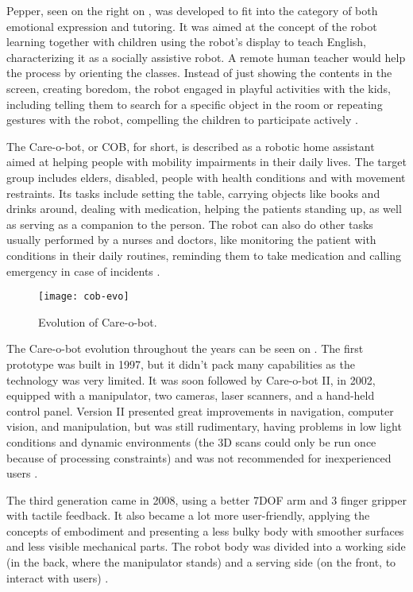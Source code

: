 Pepper, seen on the right on , was developed to fit into the category of both emotional expression and tutoring. It was aimed at the concept of the robot learning together with children using the robot's display to teach English, characterizing it as a socially assistive robot. A remote human teacher would help the process by orienting the classes. Instead of just showing the contents in the screen, creating boredom, the robot engaged in playful activities with the kids, including telling them to search for a specific object in the room or repeating gestures with the robot, compelling the children to participate actively \cite{tanaka2015pepper}.

The Care-o-bot, or COB, for short, is described as a robotic home assistant aimed at helping people with mobility impairments in their daily lives. The target group includes elders, disabled, people with health conditions and with movement restraints. Its tasks include setting the table, carrying objects like books and drinks around, dealing with medication, helping the patients standing up, as well as serving as a companion to the person. The robot can also do other tasks usually performed by a nurses and doctors, like monitoring the patient with conditions in their daily routines, reminding them to take medication and calling emergency in case of incidents \cite{graf2004care}.

\begin{figure}[!ht]
    \centering
    \texttt{[image: cob-evo]}
    \caption{Evolution of Care-o-bot.}
    \label{fig:cob-evo}
\end{figure}

The Care-o-bot evolution throughout the years can be seen on . The first prototype was built in 1997, but it didn't pack many capabilities as the technology was very limited. It was soon followed by Care-o-bot II, in 2002, equipped with a manipulator, two cameras, laser scanners, and a hand-held control panel. Version II presented great improvements in navigation, computer vision, and manipulation, but was still rudimentary, having problems in low light conditions and dynamic environments (the 3D scans could only be run once because of processing constraints) and was not recommended for inexperienced users \cite{graf2004care}.

The third generation came in 2008, using a better 7DOF arm and 3 finger gripper with tactile feedback. It also became a lot more user-friendly, applying the concepts of embodiment and presenting a less bulky body with smoother surfaces and less visible mechanical parts. The robot body was divided into a working side (in the back, where the manipulator stands) and a serving side (on the front, to interact with users) \cite{graf2009robotic}.

